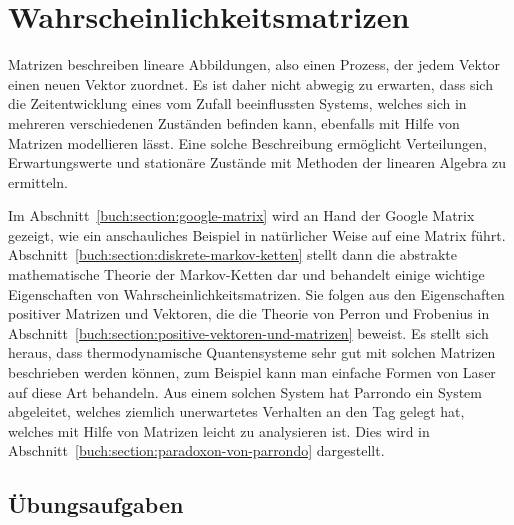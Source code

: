 %
%
%
\chapter{Wahrscheinlichkeitsmatrizen
\label{buch:chapter:wahrscheinlichkeit}}
\rhead{}
Matrizen beschreiben lineare Abbildungen, also einen Prozess, der
jedem Vektor einen neuen Vektor zuordnet.
Es ist daher nicht abwegig zu erwarten, dass sich 
die Zeitentwicklung eines vom Zufall beeinflussten Systems, welches sich
in mehreren verschiedenen Zuständen befinden kann, ebenfalls mit Hilfe
von Matrizen modellieren lässt.
Eine solche Beschreibung ermöglicht Verteilungen,
Erwartungswerte und stationäre Zustände mit Methoden der linearen
Algebra zu ermitteln.

Im Abschnitt~\ref{buch:section:google-matrix} wird an Hand der Google
Matrix gezeigt, wie ein anschauliches Beispiel in natürlicher Weise
auf eine Matrix führt.
Abschnitt~\ref{buch:section:diskrete-markov-ketten} stellt dann die abstrakte
mathematische Theorie der Markov-Ketten dar und behandelt einige wichtige
Eigenschaften von Wahrscheinlichkeitsmatrizen.
Sie folgen aus den Eigenschaften positiver Matrizen und Vektoren, 
die die Theorie von Perron und Frobenius in
Abschnitt~\ref{buch:section:positive-vektoren-und-matrizen}
beweist.
Es stellt sich heraus, dass thermodynamische Quantensysteme sehr gut
mit solchen Matrizen beschrieben werden können, zum Beispiel kann man
einfache Formen von Laser auf diese Art behandeln.
Aus einem solchen System hat Parrondo ein System abgeleitet, welches 
ziemlich unerwartetes Verhalten an den Tag gelegt hat, welches mit
Hilfe von Matrizen leicht zu analysieren ist. 
Dies wird in Abschnitt~\ref{buch:section:paradoxon-von-parrondo}
dargestellt.






\section*{Übungsaufgaben}
\begin{uebungsaufgaben}
\end{uebungsaufgaben}

